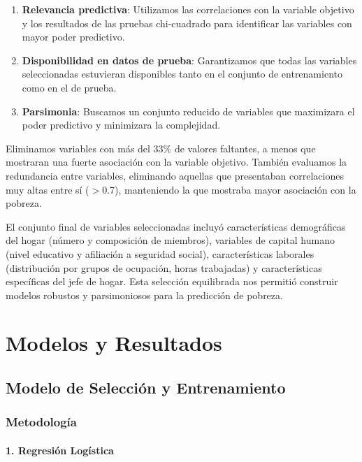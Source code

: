 \documentclass[12pt,a4paper,onecolumn]{article}
\begin{document}
\begin{enumerate}
   \item \textbf{Relevancia predictiva}: Utilizamos las correlaciones con la variable objetivo y los resultados de las pruebas chi-cuadrado para identificar las variables con mayor poder predictivo.

   \item \textbf{Disponibilidad en datos de prueba}: Garantizamos que todas las variables seleccionadas estuvieran disponibles tanto en el conjunto de entrenamiento como en el de prueba.

   \item \textbf{Parsimonia}: Buscamos un conjunto reducido de variables que maximizara el poder predictivo y minimizara la complejidad.
\end{enumerate}

Eliminamos variables con más del 33\% de valores faltantes, a menos que mostraran una fuerte asociación con la variable objetivo. También evaluamos la redundancia entre variables, eliminando aquellas que presentaban correlaciones muy altas entre sí ($>$0.7), manteniendo la que mostraba mayor asociación con la pobreza.

El conjunto final de variables seleccionadas incluyó características demográficas del hogar (número y composición de miembros), variables de capital humano (nivel educativo y afiliación a seguridad social), características laborales (distribución por grupos de ocupación, horas trabajadas) y características específicas del jefe de hogar. Esta selección equilibrada nos permitió construir modelos robustos y parsimoniosos para la predicción de pobreza.

\section{Modelos y Resultados}

\subsection{Modelo de Selección y Entrenamiento}

\subsubsection{Metodología}

\paragraph{1. Regresión Logística}
\end{document}
